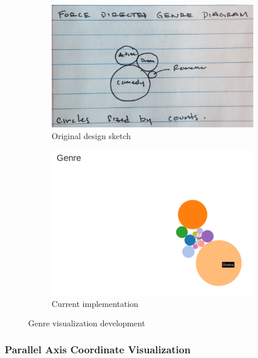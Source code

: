 \documentclass[12pt]{article}
\begin{document}
	\begin{figure}[h!]
		\centering
		\begin{subfigure}[t]{.5\textwidth}
		  \centering
		  \includegraphics[width=\linewidth]{images/genreVis_crop.png}
		  \caption{Original design sketch}
		  \label{fig:sub1}
		\end{subfigure}%
		\begin{subfigure}[t]{.8\textwidth}
		  \centering
		  \includegraphics[width=.7\linewidth]{images/genreVis.png}
		  \caption{Current implementation}
		  \label{fig:sub2}
		\end{subfigure}%
		\caption{Genre visualization development}
		\label{fig:genreVis}
	\end{figure}

\subsubsection{Parallel Axis Coordinate Visualization}
	
\end{document}

